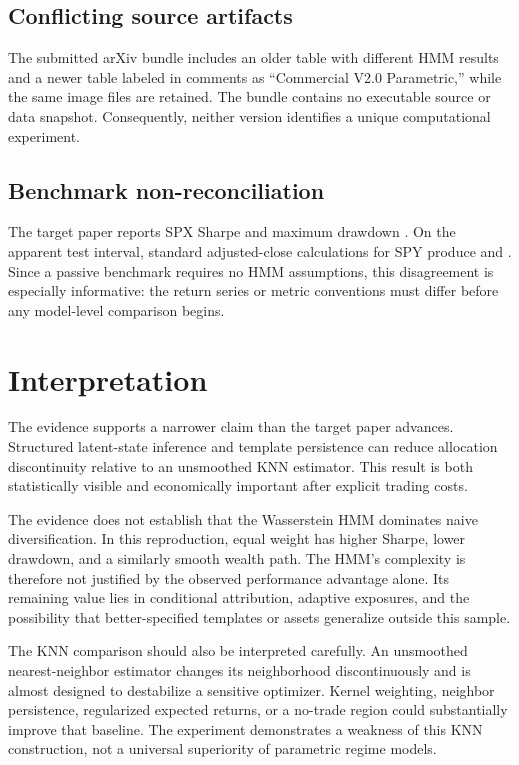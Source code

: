 \documentclass[11pt]{article}
\begin{document}
\subsection{Conflicting source artifacts}

The submitted arXiv bundle includes an older table with different HMM results and a newer table labeled in comments as ``Commercial V2.0 Parametric,'' while the same image files are retained. The bundle contains no executable source or data snapshot. Consequently, neither version identifies a unique computational experiment.

\subsection{Benchmark non-reconciliation}

The target paper reports SPX Sharpe \PubSPXSharpe{} and maximum drawdown \PubSPXMaxDD{}. On the apparent test interval, standard adjusted-close calculations for SPY produce \RepSPXSharpe{} and \RepSPXMaxDD{}. Since a passive benchmark requires no HMM assumptions, this disagreement is especially informative: the return series or metric conventions must differ before any model-level comparison begins.

\section{Interpretation}

The evidence supports a narrower claim than the target paper advances. Structured latent-state inference and template persistence can reduce allocation discontinuity relative to an unsmoothed KNN estimator. This result is both statistically visible and economically important after explicit trading costs.

The evidence does not establish that the Wasserstein HMM dominates naive diversification. In this reproduction, equal weight has higher Sharpe, lower drawdown, and a similarly smooth wealth path. The HMM's complexity is therefore not justified by the observed performance advantage alone. Its remaining value lies in conditional attribution, adaptive exposures, and the possibility that better-specified templates or assets generalize outside this sample.

The KNN comparison should also be interpreted carefully. An unsmoothed nearest-neighbor estimator changes its neighborhood discontinuously and is almost designed to destabilize a sensitive optimizer. Kernel weighting, neighbor persistence, regularized expected returns, or a no-trade region could substantially improve that baseline. The experiment demonstrates a weakness of this KNN construction, not a universal superiority of parametric regime models.
\end{document}

